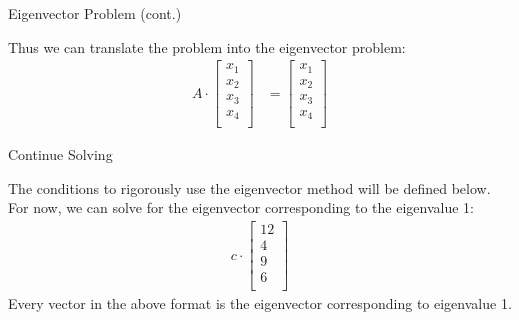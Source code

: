 \documentclass{beamer}
\begin{document}
\begin{frame}[t]{Eigenvector Problem (cont.)}
\begin{outline}
    \1 Thus we can translate the problem into the eigenvector problem:
    \begin{align*}
        A\cdot \begin{bmatrix}
            x_1\\
            x_2\\
            x_3\\
            x_4\\
        \end{bmatrix} &= \begin{bmatrix}
            x_1\\
            x_2\\
            x_3\\
            x_4\\
        \end{bmatrix}
    \end{align*}
\end{outline}
\end{frame}




\begin{frame}[t]{Continue Solving}
\begin{outline}
    \1 The conditions to rigorously use the eigenvector method will be defined below. For now, we can solve for the eigenvector corresponding to the eigenvalue 1:
    \begin{align*}
        c\cdot \begin{bmatrix}
            12\\ 4\\ 9\\ 6\\
        \end{bmatrix}
    \end{align*}
    \1 Every vector in the above format is the eigenvector corresponding to eigenvalue 1. 
\end{outline}
\end{frame}
\end{document}
